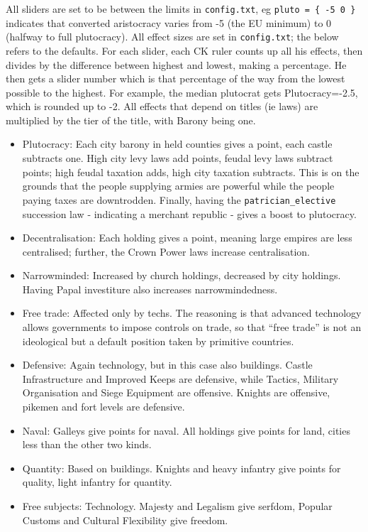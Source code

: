 \documentclass[12pt,ebook,oneside]{book}
\begin{document}
All sliders are set to be between the limits in \verb|config.txt|, 
eg \verb|pluto = { -5 0 }| indicates that converted aristocracy varies from -5
(the EU minimum) to 0 (halfway to full plutocracy). All effect sizes
are set in \verb|config.txt|; the below refers to the defaults. For
each slider, each CK ruler counts up all his effects, then divides by
the difference between highest and lowest, making a percentage. He
then gets a slider number which is that percentage of the way from the
lowest possible to the highest. For example, the median plutocrat 
gets Plutocracy=-2.5, which is rounded up to -2. All effects that
depend on titles (ie laws) are multiplied by the tier of the title,
with Barony being one. 

\begin{itemize}
\item Plutocracy: Each city barony in held counties gives a point, each castle
  subtracts one. High city levy laws add points, feudal levy laws subtract
  points; high feudal taxation adds, high city taxation
  subtracts. This is on the grounds that the people supplying armies are
  powerful while the people paying taxes are downtrodden. Finally,
  having the \verb|patrician_elective| succession law - indicating a
  merchant republic - gives a boost to plutocracy. 
\item Decentralisation: Each holding gives a point, meaning large
  empires are less centralised; further, the Crown Power laws increase
  centralisation. 
\item Narrowminded: Increased by church holdings, decreased by city
  holdings. Having Papal investiture also increases narrowmindedness. 
\item Free trade: Affected only by techs. The reasoning is that
  advanced technology allows governments to impose controls on trade,
  so that ``free trade'' is not an ideological but a default position
  taken by primitive countries. 
\item Defensive: Again technology, but in this case also buildings. Castle Infrastructure and Improved
  Keeps are defensive, while Tactics, Military Organisation and Siege
  Equipment are offensive. Knights are offensive, pikemen and fort
  levels are defensive. 
\item Naval: Galleys give points for naval. All holdings give points
  for land, cities less than the other two kinds. 
\item Quantity: Based on buildings. Knights and heavy infantry give
  points for quality, light infantry for quantity. 
\item Free subjects: Technology. Majesty and Legalism give serfdom,
  Popular Customs and Cultural Flexibility give freedom. 
\end{itemize}
\end{document}
